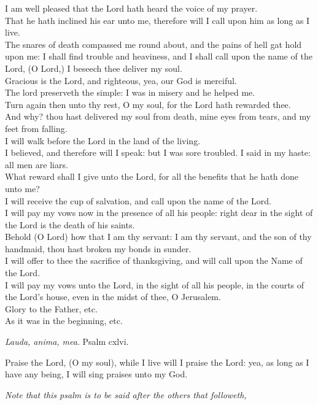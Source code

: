 \documentclass[
]{book}
\begin{document}
I am well pleased that the Lord hath heard the voice of my prayer.\\
That he hath inclined his ear unto me, therefore will I call upon him as long as I live.\\
The snares of death compassed me round about, and the pains of hell gat hold upon me: I shall find trouble and heaviness, and I shall call upon the name of the Lord, (O Lord,) I beseech thee deliver my soul.\\
Gracious is the Lord, and righteous, yea, our God is merciful.\\
The lord preserveth the simple: I was in misery and he helped me.\\
Turn again then unto thy rest, O my soul, for the Lord hath rewarded thee.\\
And why? thou hast delivered my soul from death, mine eyes from tears, and my feet from falling.\\
I will walk before the Lord in the land of the living.\\
I believed, and therefore will I speak: but I was sore troubled. I said in my haste: all men are liars.\\
What reward shall I give unto the Lord, for all the benefits that he hath done unto me?\\
I will receive the cup of salvation, and call upon the name of the Lord.\\
I will pay my vows now in the presence of all his people: right dear in the sight of the Lord is the death of his saints.\\
Behold (O Lord) how that I am thy servant: I am thy servant, and the son of thy handmaid, thou hast broken my bonds in sunder.\\
I will offer to thee the sacrifice of thanksgiving, and will call upon the Name of the Lord.\\
I will pay my vows unto the Lord, in the sight of all his people, in the courts of the Lord's house, even in the midst of thee, O Jerusalem.\\
Glory to the Father, etc.\\
As it was in the beginning, etc.

\emph{Lauda, anima, mea}. Psalm cxlvi.

Praise the Lord, (O my soul), while I live will I praise the Lord: yea, as long as I have any being, I will sing praises unto my God.

\begin{center}
\emph{Note that this psalm is to be said after the others that followeth,}

\end{center}
\end{document}

